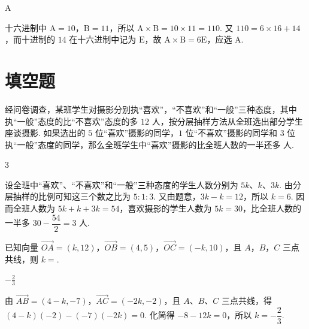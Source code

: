 \begin{answer}
A
\end{answer}

\begin{solution}
十六进制中 \(\mathrm A=10\)，\(\mathrm B=11\)，所以 \(\mathrm A\times\mathrm B=10\times11=110\). 又 \(110=6\times16+14\)，而十进制的 \(14\) 在十六进制中记为 \(\mathrm E\)，故 \(\mathrm A\times\mathrm B=6\mathrm E\)，应选 A.
\end{solution}


\section{填空题}
\begin{problem}
经问卷调查，某班学生对摄影分别执“喜欢”，“不喜欢”和“一般”三种态度，其中执“一般”态度的比“不喜欢”态度的多 \(12\text{ 人}\)，按分层抽样方法从全班选出部分学生座谈摄影. 如果选出的 \(5\text{ 位}\)“喜欢”摄影的同学，\(1\text{ 位}\)“不喜欢”摄影的同学和 \(3\text{ 位}\)执“一般”态度的同学，那么全班学生中“喜欢”摄影的比全班人数的一半还多\fillinblank{}\(\text{ 人}\).
\end{problem}

\begin{answer}
3
\end{answer}

\begin{solution}
设全班中“喜欢”、“不喜欢”和“一般”三种态度的学生人数分别为 \(5k\)、\(k\)、\(3k\). 由分层抽样的比例可知这三个数之比为 \(5:1:3\). 又由题意，\(3k-k=12\)，所以 \(k=6\). 因而全班人数为 \(5k+k+3k=54\)，喜欢摄影的学生人数为 \(5k=30\)，比全班人数的一半多 \(30-\dfrac{54}{2}=3\) 人.
\end{solution}



\begin{problem}
已知向量 \(\overrightarrow{OA} = (k, 12)\)，\(\overrightarrow{OB} = (4, 5)\)，\(\overrightarrow{OC} = (-k, 10)\)，且 \(A\)，\(B\)，\(C\) 三点共线，则 \(k =\)\fillinblank{}.
\end{problem}

\begin{answer}
\(-\frac{2}{3}\)
\end{answer}

\begin{solution}
由 \(\overrightarrow{AB}=(4-k,-7)\)，\(\overrightarrow{AC}=(-2k,-2)\)，且 \(A\)、\(B\)、\(C\) 三点共线，得
\((4-k)(-2)-(-7)(-2k)=0\). 化简得 \(-8-12k=0\)，所以 \(k=-\dfrac23\).
\end{solution}



